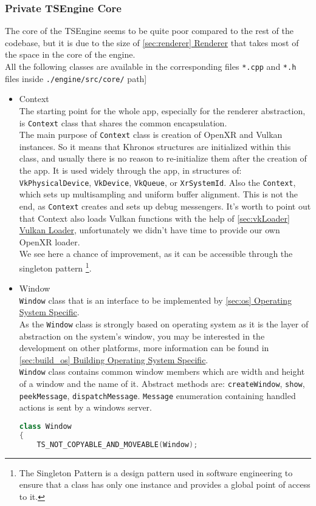 \subsubsection{Private TSEngine Core}
\hspace{\parindent} The core of the TSEngine seems to be quite poor compared to the rest of the codebase, but it is due to the size of \hyperref[sec:renderer]{\ref*{sec:renderer} Renderer} that takes most of the space in the core of the engine.\\
All the following classes are available in the corresponding files \texttt{*.cpp} and \texttt{*.h} files inside \texttt{./engine/src/core/} path]\\
\begin{itemize}
    \item Context\\
    \label{context}
    The starting point for the whole app, especially for the renderer abstraction, is \texttt{Context} class that shares the common encapsulation.\\
    The main purpose of \texttt{Context} class is creation of OpenXR and Vulkan instances. So it means that Khronos structures are initialized within this class, and usually there is no reason to re-initialize them after the creation of the app. It is used widely through the app, in structures of: \texttt{VkPhysicalDevice}, \texttt{VkDevice}, \texttt{VkQueue}, or \texttt{XrSystemId}. Also the \texttt{Context}, which sets up multisampling and uniform buffer alignment. This is not the end, as \texttt{Context} creates and sets up debug messengers.
    It's worth to point out that Context also loads Vulkan functions with the help of \hyperref[sec:vkLoader]{\ref*{sec:vkLoader} Vulkan Loader}, unfortunately we didn't have time to provide our own OpenXR loader.\\
    We see here a chance of improvement, as it can be accessible through the singleton pattern
    \footnote{The Singleton Pattern is a design pattern used in software engineering to ensure that a class has only one instance and provides a global point of access to it.}.
    \item Window\\
    \label{window}
    \texttt{Window} class that is an interface to be implemented by \hyperref[sec:os]{\ref*{sec:os} Operating System Specific}.\\
    As the \texttt{Window} class is strongly based on operating system as it is the layer of abstraction on the system's window, you may be interested in the development on other platforms, more information can be found in \hyperref[sec:build_os]{\ref*{sec:build_os} Building Operating System Specific}.\\
    \texttt{Window} class contains common window members which are width and height of a window and the name of it. Abstract methods are: \texttt{createWindow}, \texttt{show}, \texttt{peekMessage}, \texttt{dispatchMessage}. \texttt{Message} enumeration containing handled actions is sent by a windows server. 
\begin{lstlisting}[language=c++, caption=Engine window interface (./engine/src/core/window.h)]
class Window
{
    TS_NOT_COPYABLE_AND_MOVEABLE(Window);


\end{lstlisting}
\end{itemize}
